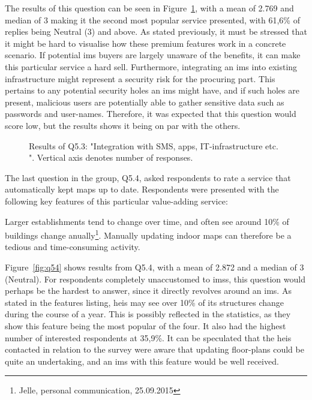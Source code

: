 The results of this question can be seen in Figure~\ref{fig:q53}, with a mean of 2.769 and median of 3 making it the second most popular service presented, with 61,6\% of replies being Neutral (3) and above. As stated previously, it must be stressed that it might be hard to visualise how these premium features work in a concrete scenario. If potential \gls{ims} buyers are largely unaware of the benefits, it can make this particular service a hard sell. Furthermore, integrating an \gls{ims} into existing infrastructure might represent a security risk for the procuring part. This pertains to any potential security holes an \gls{ims} might have, and if such holes are present, malicious users are potentially able to gather sensitive data such as passwords and user-names. Therefore, it was expected that this question would score low, but the results shows it being on par with the others.  

\begin{figure}[H]
    \centering
    \caption{Results of Q5.3: "Integration with SMS, apps, IT-infrastructure etc.
". Vertical axis denotes number of responses.}
    \label{fig:q53}
\end{figure}

The last question in the group, Q5.4, asked respondents to rate a service that automatically kept maps up to date. Respondents were presented with the following key features of this particular value-adding service:

\begin{displayquote}
Larger establishments tend to change over time, and often see around 10\% of buildings change anually\footnote{Jelle, personal communication, 25.09.2015}. Manually updating indoor maps can therefore be a tedious and time-consuming activity.
\end{displayquote}

Figure~\ref{fig:q54} shows results from Q5.4, with a mean of 2.872 and a median of 3 (Neutral). For respondents completely unaccustomed to \glspl{ims}, this question would perhaps be the hardest to answer, since it directly revolves around an \gls{ims}. As stated in the features listing, \glspl{hei} may see over 10\% of its structures change during the course of a year. This is possibly reflected in the statistics, as they show this feature being the most popular of the four. It also had the highest number of interested respondents at 35,9\%. It can be speculated that the \glspl{hei} contacted in relation to the survey were aware that updating floor-plans could be quite an undertaking, and an \gls{ims} with this feature would be well received. 


